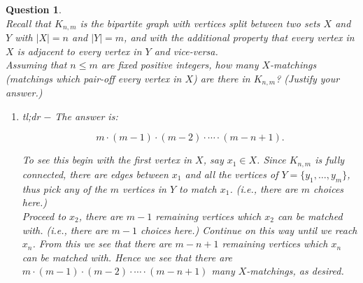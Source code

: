 \documentclass[twoside]{article}
\theoremstyle{mystyle}
\newtheorem{quest}{Question}
\begin{document}
\begin{quest} \mbox{}\\

\noindent Recall that $K_{n,m}$ is the bipartite graph with vertices split between two sets $X$ and $Y$ with $|X|=n$ and $|Y| = m$, and with the additional property that every vertex in $X$ is adjacent to every vertex in $Y$ and vice-versa.\\

\noindent Assuming that $n \leq m$ are fixed positive integers, how many $X$-matchings (matchings which pair-off every vertex in $X$) are there in $K_{n,m}$? (Justify your answer.)

\begin{enumerate}

\item[{\bfseries Solution:}]
\emph{tl;dr} $-$ The answer is: 

\[m\cdot (m-1)\cdot (m-2) \cdot \cdots \cdot (m-n+1).\]


To see this begin with the first vertex in $X$, say $x_1 \in X$. Since $K_{n,m}$ is fully connected, there are edges between $x_1$ and all the vertices of $Y = \{y_1, \ldots, y_m\}$, thus pick any of the $m$ vertices in $Y$ to match $x_1$. (i.e., there are $m$ choices here.) \\

Proceed to $x_2$, there are $m-1$ remaining vertices which $x_2$ can be matched with. (i.e., there are $m-1$ choices here.) Continue on this way until we reach $x_n$. From this we see that there are $m - n + 1$ remaining vertices which $x_n$ can be matched with. Hence we see that there are $m\cdot (m-1)\cdot (m-2) \cdot \cdots \cdot (m-n+1)$ many $X$-matchings, as desired.
\end{enumerate}

\end{quest}

     
     
\end{document}
